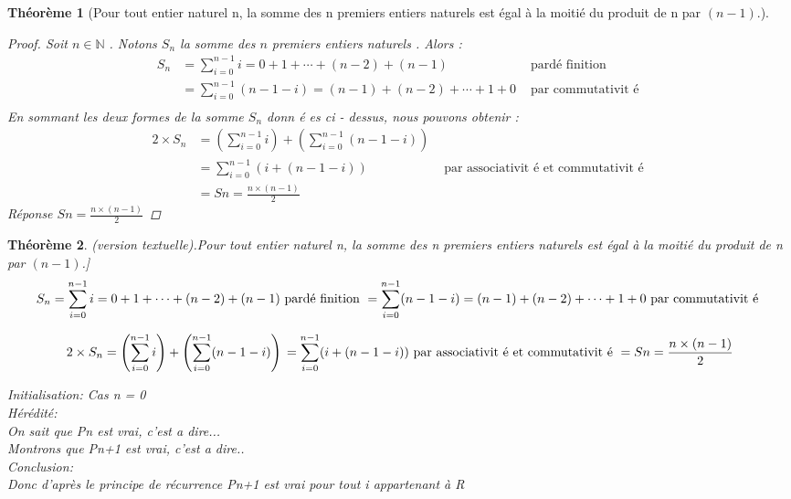 \documentclass[french,titlepage] {article}
\newtheorem {theorem}{Théorème}
\begin{document}
\begin{theorem}[Pour tout entier naturel n, la somme des n premiers entiers
naturels est égal à la moitié du produit de n par $(n  -  1)$.]

\begin{proof}
Soit $ n\in\mathbb { N } $ .
Notons $ S_n $ la somme des $ n $ premiers entiers naturels .
Alors :
\begin{align*}
S_n & = \sum_ { i = 0 } ^ { n - 1 } i
= 0 + 1 + \cdots + ( n - 2) + ( n - 1)
& \text { pardé finition } \\
& = \sum_ { i = 0 } ^ { n - 1 } ( n - 1 - i )
= ( n - 1) + ( n - 2) + \cdots + 1 + 0
& \text { par commutativit é } \\
\end{align*}
En sommant les deux formes de la somme $ S_n $ donn é es ci - dessus,
nous pouvons obtenir :
\label{1ererep}
\begin{align*}
2 \times S_n
& = \left ( \sum_ { i = 0 } ^ { n - 1 } i\right )
+ \left ( \sum_ { i = 0 } ^ { n - 1 } ( n - 1 - i ) \right ) \\
& = \sum_ { i = 0 } ^ { n - 1 } ( i + ( n - 1 - i ))
& \text { par associativit é et commutativit é } \\
& = Sn = \frac {n \times(n - 1)}{2} 
\end{align*}
\emph{ Réponse  }
$Sn = \frac {n \times(n - 1)}{2} $
\end{proof}




\end{theorem}

\begin{theorem}(version textuelle).Pour tout entier naturel n, la somme des n premiers entiers
naturels est égal à la moitié du produit de n par $(n  -  1)$.]
\begin{equation}
S_n  = \sum_ { i = 0 } ^ { n - 1 } i
= 0 + 1 + \cdots + ( n - 2) + ( n - 1)
 \text { pardé finition } \\
 = \sum_ { i = 0 } ^ { n - 1 } ( n - 1 - i )
= ( n - 1) + ( n - 2) + \cdots + 1 + 0
 \text { par commutativit é } \\
\end{equation}

\begin{equation*}
2 \times S_n
 = \left ( \sum_ { i = 0 } ^ { n - 1 } i\right )
+ \left ( \sum_ { i = 0 } ^ { n - 1 } ( n - 1 - i ) \right ) \\
 = \sum_ { i = 0 } ^ { n - 1 } ( i + ( n - 1 - i ))
 \text { par associativit é et commutativit é } \\
 = Sn = \frac {n \times(n - 1)}{2} 
\end{equation*}

Initialisation: Cas n = 0 \\
Hérédité:\\
On sait que Pn est vrai, c'est a dire...\\
Montrons que Pn+1 est vrai, c'est a dire..\\
Conclusion:\\
Donc d'après le principe de récurrence Pn+1 est vrai pour tout i appartenant à R



\end{theorem}
\end{document}
